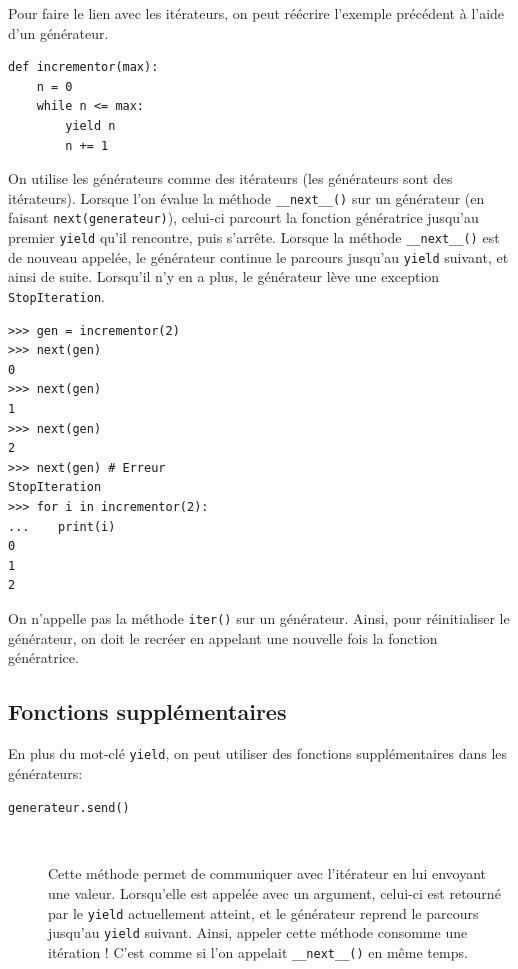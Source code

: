 \documentclass[a4paper, 10pt]{article}
\begin{document}
Pour faire le lien avec les itérateurs, on peut réécrire l'exemple précédent à l'aide d'un générateur.
\begin{verbatim}
def incrementor(max):
    n = 0
    while n <= max:
        yield n
        n += 1
\end{verbatim}

On utilise les générateurs comme des itérateurs (les générateurs sont des itérateurs). Lorsque l'on évalue la méthode \texttt{__next__()} sur un générateur (en faisant \texttt{next(generateur)}), celui-ci parcourt la fonction génératrice jusqu'au premier \texttt{yield} qu'il rencontre, puis s'arrête. Lorsque la méthode \texttt{__next__()} est de nouveau appelée, le générateur continue le parcours jusqu'au \texttt{yield} suivant, et ainsi de suite. Lorsqu'il n'y en a plus, le générateur lève une exception \texttt{StopIteration}.
\begin{verbatim}
>>> gen = incrementor(2)
>>> next(gen)
0
>>> next(gen)
1
>>> next(gen)
2
>>> next(gen) # Erreur
StopIteration
>>> for i in incrementor(2):
...    print(i)
0
1
2
\end{verbatim}

On n'appelle pas la méthode \texttt{iter()} sur un générateur. Ainsi, pour réinitialiser le générateur, on doit le recréer en appelant une nouvelle fois la fonction génératrice.

\subsection{Fonctions supplémentaires}
En plus du mot-clé \texttt{yield}, on peut utiliser des fonctions supplémentaires dans les générateurs:
\begin{description}
    \item[\texttt{generateur.send()}]~

    Cette méthode permet de communiquer avec l'itérateur en lui envoyant une valeur. Lorsqu'elle est appelée avec un argument, celui-ci est retourné par le \texttt{yield} actuellement atteint, et le générateur reprend le parcours jusqu'au \texttt{yield} suivant. Ainsi, appeler cette méthode consomme une itération ! C'est comme si l'on appelait \texttt{__next__()} en même temps.
\end{description}
\end{document}
